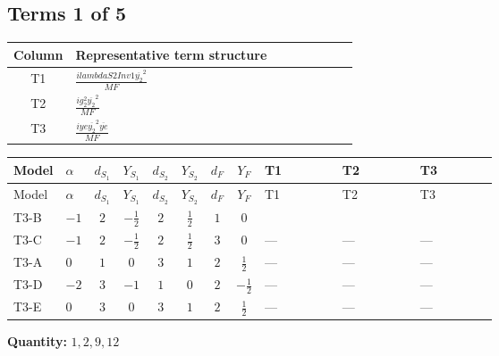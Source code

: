 \documentclass[8pt]{article}
\begin{document}
\begin{landscape}
\subsection*{Terms 1 of 5}
\begin{center}
\begin{tabular}{@{}c >{\raggedright\arraybackslash}p{0.82\linewidth}@{}}
\toprule
Column & Representative term structure \\
\midrule
T1 & \(\displaystyle \frac{i lambdaS2Inv1 \overline{y_{2}}^{2}}{MF}\) \\
\midrule
T2 & \(\displaystyle \frac{i g_{2}^{2} \overline{y_{2}}^{2}}{MF}\) \\
\midrule
T3 & \(\displaystyle \frac{i ye \overline{y_{2}}^{2} \overline{ye}}{MF}\) \\
\midrule
\bottomrule
\end{tabular}
\end{center}
\smallskip
\tiny
\begin{longtable}{@{}llcccccc >{\raggedright\arraybackslash}p{0.21\linewidth} >{\raggedright\arraybackslash}p{0.21\linewidth} >{\raggedright\arraybackslash}p{0.21\linewidth}@{}}
\toprule
Model & $\alpha$ & $d_{S_1}$ & $Y_{S_1}$ & $d_{S_2}$ & $Y_{S_2}$ & $d_F$ & $Y_F$ & T1 & T2 & T3 \\
\midrule
\endfirsthead
\toprule
Model & $\alpha$ & $d_{S_1}$ & $Y_{S_1}$ & $d_{S_2}$ & $Y_{S_2}$ & $d_F$ & $Y_F$ & T1 & T2 & T3 \\
\midrule
\endhead
T3-B & $-1$ & $2$ & $-\frac{1}{2}$ & $2$ & $\frac{1}{2}$ & $1$ & $0$ & \scriptsize\adjustbox{max width=\linewidth}{$\begin{gathered} \frac{i lambdaS2Inv1 \overline{y_{2}}^{2}}{4 MF}\end{gathered}$} & \scriptsize\adjustbox{max width=\linewidth}{$\begin{gathered} \frac{3 i g_{2}^{2} \overline{y_{2}}^{2}}{8 MF}\end{gathered}$} & \scriptsize\adjustbox{max width=\linewidth}{$\begin{gathered} - \frac{i ye \overline{y_{2}}^{2} \overline{ye}}{8 MF}\end{gathered}$} \\
\midrule
T3-C & $-1$ & $2$ & $-\frac{1}{2}$ & $2$ & $\frac{1}{2}$ & $3$ & $0$ & --- & --- & --- \\
\midrule
T3-A & $0$ & $1$ & $0$ & $3$ & $1$ & $2$ & $\frac{1}{2}$ & --- & --- & --- \\
\midrule
T3-D & $-2$ & $3$ & $-1$ & $1$ & $0$ & $2$ & $-\frac{1}{2}$ & --- & --- & --- \\
\midrule
T3-E & $0$ & $3$ & $0$ & $3$ & $1$ & $2$ & $\frac{1}{2}$ & --- & --- & --- \\
\midrule
\bottomrule
\end{longtable}
\clearpage
\noindent\textbf{Quantity: }$\mathrm{1,2,9,12}$\par\smallskip

\end{landscape}
\end{document}
